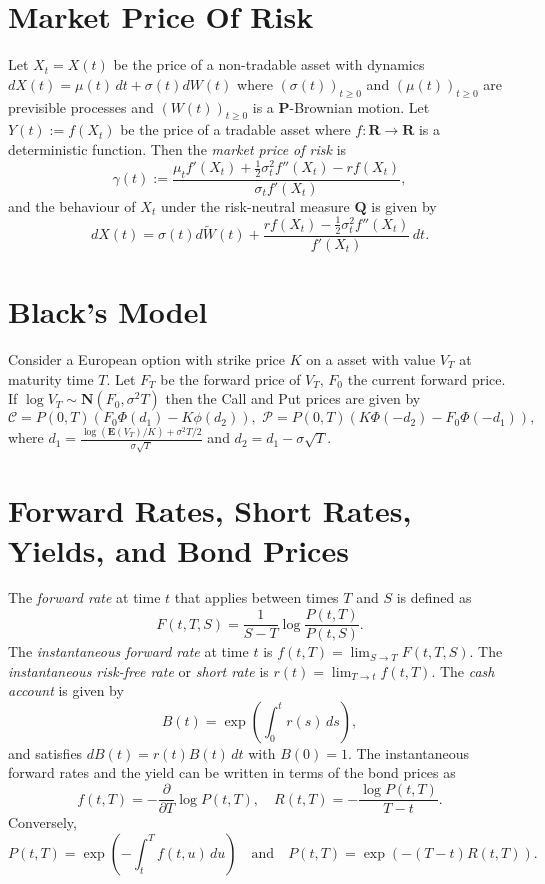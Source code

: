 \documentclass[twocolumn]{amsart}
\renewcommand{\P}{\mathbf{P}}
\newcommand{\Q}{\mathbf{Q}}
\newcommand{\E}{\mathbf{E}}
\newcommand{\R}{\mathbf{R}}
\newcommand{\Normal}{\mathbf{N}}
\newcommand{\Call}{\mathcal{C}}
\newcommand{\Put}{\mathcal{P}}
\newcommand{\tW}{\widetilde W}
\begin{document}
\section*{Market Price Of Risk}

Let $X_t = X(t)$ be the price of a non-tradable asset with dynamics $dX(t) =  \mu(t)\,dt + \sigma(t) dW(t)$ where $(\sigma(t))_{t \ge 0}$ and $(\mu(t))_{t \ge 0}$ are previsible processes and $(W(t))_{t \ge 0}$ is a $\P$-Brownian motion. Let $Y(t) := f(X_t)$ be the price of a tradable asset where $f: \R \to \R$ is a deterministic function. Then the \emph{market price of risk} is
\[ \gamma(t) := \frac{\mu_t f'(X_t) + \frac{1}{2} \sigma_t^2 f''(X_t) - r f(X_t)}{\sigma_t f'(X_t)}, \]
and the behaviour of $X_t$ under the risk-neutral measure $\Q$ is given by
\[ dX(t) = \sigma(t) d \tW(t) + \frac{r f(X_t) - \frac{1}{2} \sigma_t^2 f''(X_t)}{f'(X_t)}\,dt. \]

\section*{Black's Model}

Consider a European option with strike price $K$ on a asset with value $V_T$ at maturity time $T$. Let $F_T$ be the forward price of $V_T$, $F_0$ the current forward price. If $\log V_T \sim \Normal(F_0, \sigma^2 T)$ then the Call and Put prices are given by
\begin{equation*}
\Call = P(0,T) (F_0 \Phi(d_1) - K \phi(d_2)), \,\, \Put = P(0,T) (K \Phi(-d_2) - F_0 \Phi(-d_1)),
\end{equation*}
where $\displaystyle d_1 = \frac{\log(\E(V_T)/K) + \sigma^2T/2}{\sigma \sqrt{T}}$ and $d_2 = d_1 - \sigma \sqrt{T}$.

\section*{Forward Rates, Short Rates, Yields, and Bond Prices}

The \emph{forward rate} at time $t$ that applies between times $T$ and $S$ is defined as
\begin{equation*}
    F(t,T,S) = \frac{1}{S-T}\log \frac{P(t,T)}{P(t,S)}.
\end{equation*}
The \emph{instantaneous forward rate} at time $t$ is $f(t,T) = \lim_{S \to T} F(t,T,S)$. The \emph{instantaneous risk-free rate} or \emph{short rate} is $r(t) = \lim_{T \to t} f(t,T)$. The \emph{cash account} is given by
\begin{equation*}
    B(t) = \exp\left(\int_0^t r(s)\,ds\right),
\end{equation*}
and satisfies $dB(t) = r(t) B(t)\,dt$ with $B(0)=1$. The instantaneous forward rates and the yield can be written in terms of the bond prices as
\[ f(t,T) = - \frac{\partial}{\partial T} \log P(t,T), \quad R(t,T) = - \frac{\log P(t,T)}{T-t}. \]
Conversely,
\[ P(t,T) = \exp \left(- \int_t^T f(t,u)\,du \right)\quad \text{and} \quad P(t,T) = \exp(-(T-t)R(t,T)). \]
\end{document}
